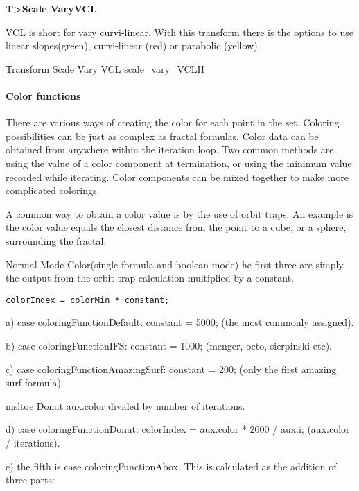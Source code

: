 \textbf{T>Scale VaryVCL}

VCL is short for vary curvi-linear. With this transform there is the options to use linear slopes(green), curvi-linear (red) or parabolic (yellow).

{Transform Scale Vary VCL}
{scale_vary_VCL}{H}




\paragraph{Color functions}

There are various ways of creating the color for each point in the set. Coloring possibilities  can be just as complex as fractal formulas. Color data can be obtained from anywhere within the iteration loop. Two common methods are using the value of a color component at termination, or using the minimum value recorded while iterating. Color components can be mixed together to make more complicated colorings.

A common way to obtain a color value is by the use of orbit traps. An example is the color value equals the closest distance from the point to a cube, or a sphere, surrounding the fractal.

Normal Mode Color(single formula and boolean mode)
he first three are simply the output from the orbit trap calculation multiplied by a constant.

\begin{lstlisting}
colorIndex = colorMin * constant;
\end{lstlisting}


a) case coloringFunctionDefault: constant = 5000; (the most commonly assigned).

b) case coloringFunctionIFS: constant = 1000; (menger, octo, sierpinski etc).

c) case coloringFunctionAmazingSurf: constant = 200; (only the first amazing surf formula).

msltoe Donut aux.color divided by number of iterations.

d) case coloringFunctionDonut: colorIndex = aux.color * 2000 / aux.i; (aux.color /  iterations).

e) the fifth is case coloringFunctionAbox. This is calculated as the addition of three parts:

